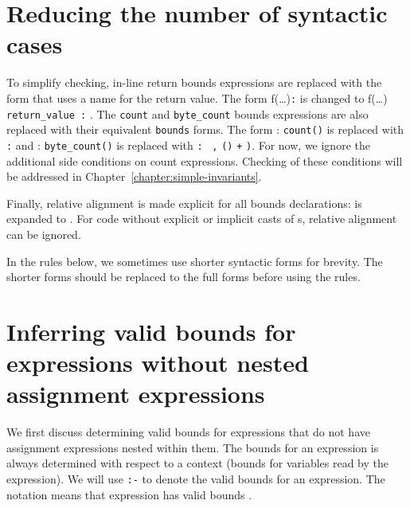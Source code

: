 \section{Reducing the number of syntactic cases}

To simplify checking, in-line return bounds expressions are replaced
with the form that uses a name for the return value. The form
f(\ldots{})\texttt{:}  is changed to f(\ldots{}) 
\texttt{return\_value :} . The \texttt{count} and
\texttt{byte\_count} bounds expressions are also replaced with their
equivalent \texttt{bounds} forms. The form  :
\texttt{count(}\texttt{)} is replaced with  \texttt{:}
 and  :
\texttt{byte\_count(}\texttt{)} is replaced with 
\texttt{:} \arrayptrchar\
\texttt{,} \texttt{(\arrayptrchar )}
\var{x} \texttt{+} \texttt{)}. For now, we ignore the
additional side conditions on count expressions. Checking of these
conditions will be addressed in Chapter~\ref{chapter:simple-invariants}.

Finally, relative alignment is made explicit for all bounds
declarations:  is expanded to
.
For code without explicit or implicit casts of \arrayptr s, relative
alignment can be ignored.

In the rules below, we sometimes use shorter syntactic forms for
brevity. The shorter forms should be replaced to the full forms before
using the rules.

\section{Inferring valid bounds for expressions without nested assignment expressions}
\label{section:inferring-expression-bounds}

We first discuss determining valid bounds for expressions that do not
have assignment expressions nested within them. The bounds for an
expression is always determined with respect to a context (bounds for
variables read by the expression). We will use \texttt{:-} to denote the
valid bounds for an expression. The notation 
means that expression \var{e} has valid bounds \var{bounds-exp}.

